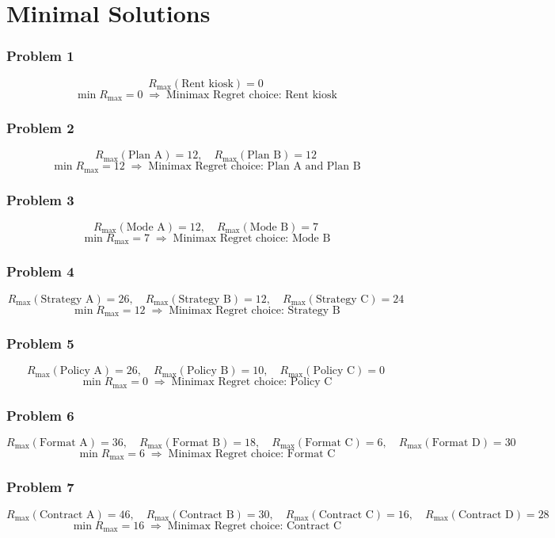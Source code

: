 \part{Minimal Solutions}
\section*{Problem 1}
\[
R_{\max}(\text{Rent kiosk})=0
\]
\[
\min R_{\max}=0\;\Rightarrow\;\text{Minimax Regret choice: Rent kiosk}
\]

\section*{Problem 2}
\[
R_{\max}(\text{Plan A})=12,\quad R_{\max}(\text{Plan B})=12
\]
\[
\min R_{\max}=12\;\Rightarrow\;\text{Minimax Regret choice: Plan A and Plan B}
\]

\section*{Problem 3}
\[
R_{\max}(\text{Mode A})=12,\quad R_{\max}(\text{Mode B})=7
\]
\[
\min R_{\max}=7\;\Rightarrow\;\text{Minimax Regret choice: Mode B}
\]

\section*{Problem 4}
\[
R_{\max}(\text{Strategy A})=26,\quad R_{\max}(\text{Strategy B})=12,\quad R_{\max}(\text{Strategy C})=24
\]
\[
\min R_{\max}=12\;\Rightarrow\;\text{Minimax Regret choice: Strategy B}
\]

\section*{Problem 5}
\[
R_{\max}(\text{Policy A})=26,\quad R_{\max}(\text{Policy B})=10,\quad R_{\max}(\text{Policy C})=0
\]
\[
\min R_{\max}=0\;\Rightarrow\;\text{Minimax Regret choice: Policy C}
\]

\section*{Problem 6}
\[
R_{\max}(\text{Format A})=36,\quad R_{\max}(\text{Format B})=18,\quad R_{\max}(\text{Format C})=6,\quad R_{\max}(\text{Format D})=30
\]
\[
\min R_{\max}=6\;\Rightarrow\;\text{Minimax Regret choice: Format C}
\]

\section*{Problem 7}
\[
R_{\max}(\text{Contract A})=46,\quad R_{\max}(\text{Contract B})=30,\quad R_{\max}(\text{Contract C})=16,\quad R_{\max}(\text{Contract D})=28
\]
\[
\min R_{\max}=16\;\Rightarrow\;\text{Minimax Regret choice: Contract C}
\]

